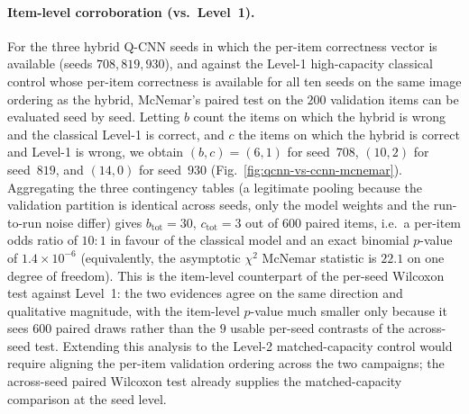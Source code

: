 \paragraph{Item-level corroboration (vs.\ Level~1).}
For the three hybrid Q-CNN seeds in which the per-item correctness
vector is available (seeds $708,819,930$), and against
the Level-1 high-capacity classical control whose per-item correctness
is available for all ten seeds on the same image ordering as the hybrid,
McNemar's paired test on the $200$ validation items can be evaluated
seed by seed. Letting $b$ count the items on which the hybrid is wrong
and the classical Level-1 is correct, and $c$ the items on which the
hybrid is correct and Level-1 is wrong, we obtain $(b,c)=(6,1)$ for
seed~$708$, $(10,2)$ for seed~$819$, and $(14,0)$ for seed~$930$
(Fig.~\ref{fig:qcnn-vs-ccnn-mcnemar}).
Aggregating the three contingency tables (a legitimate pooling because
the validation partition is identical across seeds, only the model
weights and the run-to-run noise differ) gives $b_{\mathrm{tot}}=30$,
$c_{\mathrm{tot}}=3$ out of $600$ paired items, i.e.\ a per-item odds
ratio of $10:1$ in favour of the classical model and an exact binomial
$p$-value of $1.4\times 10^{-6}$ (equivalently, the asymptotic
$\chi^{2}$ McNemar statistic is $22.1$ on one degree of freedom). This
is the item-level counterpart of the per-seed Wilcoxon test against
Level~1: the two evidences agree on the same direction and qualitative
magnitude, with the item-level $p$-value much smaller only because it
sees $600$ paired draws rather than the $9$ usable per-seed contrasts
of the across-seed test. Extending this analysis to the Level-2
matched-capacity control would require aligning the per-item validation
ordering across the two campaigns; the across-seed paired Wilcoxon test
already supplies the matched-capacity comparison at the seed level.

